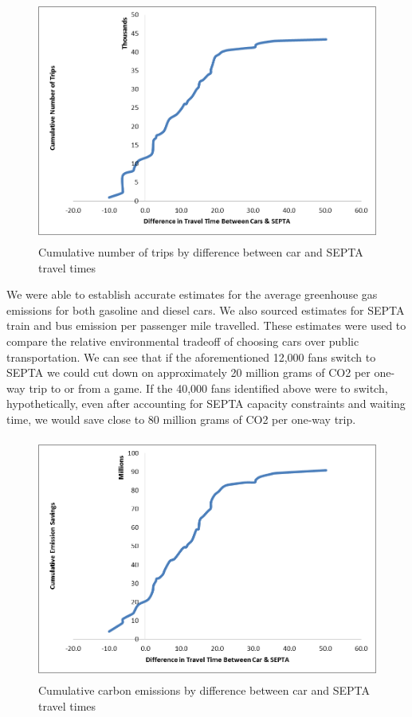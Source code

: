 \begin{figure}[htp]
  \centering
  \includegraphics[height=8cm]{graphics/graph1.png}
  \caption{Cumulative number of trips by difference between car and SEPTA travel times}
\end{figure}

We were able to establish accurate estimates for the average
greenhouse gas emissions for both gasoline and diesel cars. We also
sourced estimates for SEPTA train and bus emission per passenger mile
travelled. These estimates were used to compare the relative
environmental tradeoff of choosing cars over public transportation. We
can see that if the aforementioned 12,000 fans switch to SEPTA we
could cut down on approximately 20 million grams of CO2 per one-way
trip to or from a game. If the 40,000 fans identified above were to
switch, hypothetically, even after accounting for SEPTA capacity
constraints and waiting time, we would save close to 80 million grams
of CO2 per one-way trip.

\begin{figure}[htp]
  \centering
  \includegraphics[height=8cm]{graphics/graph2.png}
  \caption{Cumulative carbon emissions by difference between car and SEPTA travel times}
\end{figure}

